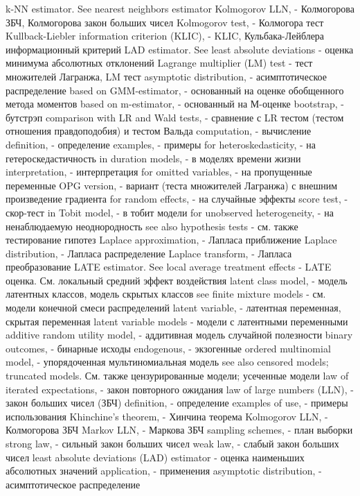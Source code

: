 k-NN estimator. See nearest neighbors estimator
Kolmogorov LLN, - Колмогорова ЗБЧ, Колмогорова закон больших чисел
Kolmogorov test, - Колмогора тест
Kullback-Liebler information criterion (KLIC), - KLIC, Кульбака-Лейблера информационный критерий
LAD estimator. See least absolute deviations - оценка минимума абсолютных отклонений
Lagrange multiplier (LM) test - тест множителей Лагранжа, LM тест
asymptotic distribution, - асимптотическое распределение
based on GMM-estimator, - основанный на оценке обобщенного метода моментов
based on m-estimator, - основанный на М-оценке
bootstrap, - бутстрэп
comparison with LR and Wald tests, - сравнение с LR тестом (тестом отношения правдоподобия) и тестом Вальда
computation, - вычисление
definition, - определение
examples, - примеры
for heteroskedasticity, - на гетероскедастичность
in duration models, - в моделях времени жизни
interpretation, - интерпретация
for omitted variables, - на пропущенные переменные
OPG version, - вариант (теста множителей Лагранжа) с внешним произведение градиента
for random effects, - на случайные эффекты
score test, - скор-тест
in Tobit model, - в тобит модели
for unobserved heterogeneity, - на ненаблюдаемую неоднородность
see also hypothesis tests - см. также тестирование гипотез
Laplace approximation, - Лапласа приближение
Laplace distribution, - Лапласа распределение
Laplace transform, - Лапласа преобразование
LATE estimator. See local average treatment effects - LATE оценка. См. локальный средний эффект воздействия
latent class model, - модель латентных классов, модель скрытых классов
see finite mixture models - см. модели конечной смеси распределений
latent variable, - латентная переменная, скрытая переменная
latent variable models - модели с латентными переменными
additive random utility model, - аддитивная модель случайной полезности
binary outcomes, - бинарные исходы
endogenous, - экзогенные
ordered multinomial model, - упорядоченная мультиномиальная модель
see also censored models; truncated models. См. также цензурированные модели; усеченные модели
law of iterated expectations, - закон повторного ожидания
law of large numbers (LLN), - закон больших чисел (ЗБЧ)
definition, - определение
examples of use, - примеры использования
Khinchine’s theorem, - Хинчина теорема
Kolmogorov LLN, - Колмогорова ЗБЧ
Markov LLN, - Маркова ЗБЧ
sampling schemes, - план выборки
strong law, - сильный закон больших чисел
weak law, - слабый закон больших чисел
least absolute deviations (LAD) estimator - оценка наименьших абсолютных значений
application, - применения
asymptotic distribution, - асимптотическое распределение
